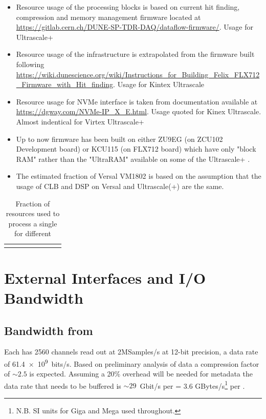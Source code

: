 \documentclass{article}
\begin{document}
\begin{itemize}
    \item Resource usage of the processing blocks is based on current hit finding, compression and memory management firmware located at \url{https://gitlab.cern.ch/DUNE-SP-TDR-DAQ/dataflow-firmware/}. Usage for Ultrascale+
    \item Resource usage of the  infrastructure is extrapolated from the firmware built following \url{https://wiki.dunescience.org/wiki/Instructions_for_Building_Felix_FLX712_Firmware_with_Hit_finding}. Usage for Kintex Ultrascale
    \item Resource usage for NVMe interface is taken from documentation available at \url{https://dgway.com/NVMe-IP_X_E.html}. Usage quoted for Kinex Ultrascale. Almost indentical for Virtex Ultrascale+
    \item Up to now firmware has been built on either ZU9EG (on ZCU102 Development board) or KCU115 (on FLX712  board) which have only "block RAM" rather than the "UltraRAM" available on some of the Ultrascale+ .
    \item The estimated fraction of Versal VM1802 is based on the assumption that the usage of CLB and DSP on Versal and Ultrascale(+) are the same.
\end{itemize}

\begin{table}[ht]
\begin{tabular}{p{2.2cm} | p{1.5cm} | p{1.3cm} p{1.3cm} | p{1.3cm} p{1.5cm} | p{1.3cm} p{1.5cm}}
\end{tabular}
\caption{Fraction of  resources used to process a single  for different  }
\label{tab:resource_fraction}
\end{table}

\section{External Interfaces and I/O Bandwidth}

\subsection{Bandwidth from }

Each \single {} has 2560 channels read out at 2MSamples/s at 12-bit precision, a data rate of  \SI{61.4e9}{bits/\second}. Based on preliminary analysis of  data\cite{ref:waldron_protodune_compression} a compression factor of $\sim 2.5$ is expected. Assuming a 20\% overhead will be needed for metadata the data rate that needs to be buffered is $\sim 29$~Gbit/s per  = 3.6 GBytes/s\footnote{N.B. SI units for Giga and Mega used throughout.} per .
\end{document}
